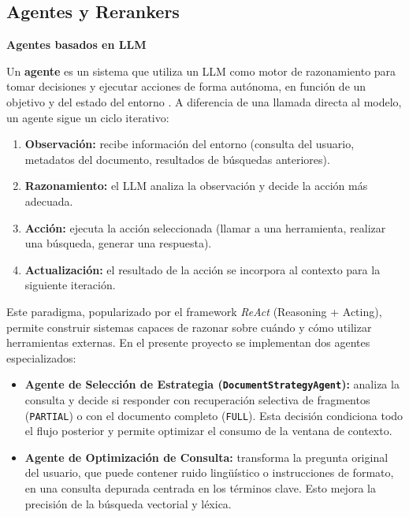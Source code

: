 \newpage
\subsection{Agentes y Rerankers}

\textbf{Agentes basados en LLM}

Un \textbf{agente} es un sistema que utiliza un LLM como motor de razonamiento para tomar decisiones y ejecutar acciones de forma autónoma, en función de un objetivo y del estado del entorno \cite{Yao2023}. A diferencia de una llamada directa al modelo, un agente sigue un ciclo iterativo:

\begin{enumerate}
    \item \textbf{Observación:} recibe información del entorno (consulta del usuario, metadatos del documento, resultados de búsquedas anteriores).
    \item \textbf{Razonamiento:} el LLM analiza la observación y decide la acción más adecuada.
    \item \textbf{Acción:} ejecuta la acción seleccionada (llamar a una herramienta, realizar una búsqueda, generar una respuesta).
    \item \textbf{Actualización:} el resultado de la acción se incorpora al contexto para la siguiente iteración.
\end{enumerate}

Este paradigma, popularizado por el framework \textit{ReAct} \cite{Yao2023} (Reasoning + Acting), permite construir sistemas capaces de razonar sobre cuándo y cómo utilizar herramientas externas. En el presente proyecto se implementan dos agentes especializados:

\begin{itemize}
    \item \textbf{Agente de Selección de Estrategia (\texttt{DocumentStrategyAgent}):} analiza la consulta y decide si responder con recuperación selectiva de fragmentos (\texttt{PARTIAL}) o con el documento completo (\texttt{FULL}). Esta decisión condiciona todo el flujo posterior y permite optimizar el consumo de la ventana de contexto.

    \item \textbf{Agente de Optimización de Consulta:} transforma la pregunta original del usuario, que puede contener ruido lingüístico o instrucciones de formato, en una consulta depurada centrada en los términos clave. Esto mejora la precisión de la búsqueda vectorial y léxica.
\end{itemize}

